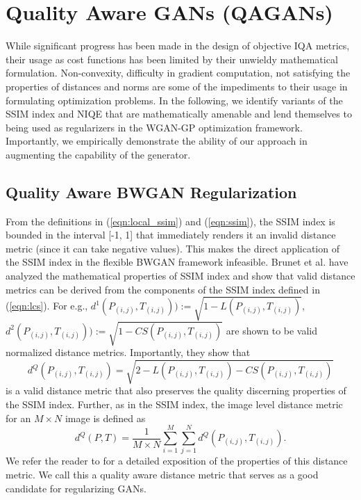 \documentclass{article}
\begin{document}
\section{Quality Aware GANs (QAGANs)}
While significant progress has been made in the design of objective IQA metrics, their usage as cost functions has been limited by their unwieldy mathematical formulation. Non-convexity, difficulty in gradient computation, not satisfying the properties of distances and norms are some of the impediments to their usage in formulating optimization problems. In the following, we identify variants of the SSIM index and NIQE that are mathematically amenable and lend themselves to being used as regularizers in the WGAN-GP optimization framework. Importantly, we empirically demonstrate the ability of our approach in augmenting the capability of the generator. 
\subsection{Quality Aware BWGAN Regularization}
From the definitions in (\ref{eqn:local_ssim}) and (\ref{eqn:ssim}), the SSIM index is bounded in the interval [-1, 1] that immediately renders it an invalid distance metric (since it can take negative values). This makes the direct application of the SSIM index in the flexible BWGAN framework infeasible. Brunet et al. \cite{brunet2011mathematical} have analyzed the mathematical properties of SSIM index and show that valid distance metrics can be derived from the components of the SSIM index defined in (\ref{eqn:lcs}). For e.g., $d^1(P_{(i, j)}, T_{(i, j)})) := \sqrt{1 - L(P_{(i, j)}, T_{(i, j)})}$, $d^2(P_{(i, j)}, T_{(i, j)})) := \sqrt{1 - CS(P_{(i, j)}, T_{(i, j)})}$ are shown to be valid normalized distance metrics. Importantly, they show that 
\begin{equation}
d^Q(P_{(i, j)}, T_{(i, j)}) = \sqrt{2-L(P_{(i, j)}, T_{(i, j)})-CS(P_{(i, j)}, T_{(i, j)})}
\label{eqn:ssim_distance}
\end{equation}
is a valid distance metric that also preserves the quality discerning properties of the SSIM index. Further, as in the SSIM index, the image level distance metric for an $M\times N$ image is defined as
\begin{equation}
    d^Q(P, T) = \frac{1}{M\times N}\sum\limits_{i=1}^M\sum\limits_{j=1}^Nd^Q(P_{(i, j)}, T_{(i, j)}).
\end{equation}
We refer the reader to \cite{brunet2011mathematical} for a detailed exposition of the properties of this distance metric. We call this a quality aware distance metric that serves as a good candidate for regularizing GANs.
\end{document}
